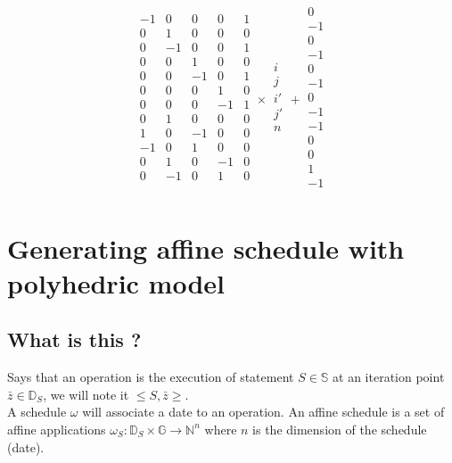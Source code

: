 \begin{itemize}
$$\begin{array}{ccccc}
		-1 & 0  & 0  & 0  & 1  \\
		0  & 1  & 0  & 0  & 0  \\
		0  & -1 & 0  & 0  & 1  \\
		0  & 0  & 1  & 0  & 0  \\
		0  & 0  & -1 & 0  & 1  \\
		0  & 0  & 0  & 1  & 0  \\
		0  & 0  & 0  & -1 & 1  \\
		0  & 1  & 0  & 0  & 0  \\
		1  & 0  & -1 & 0  & 0  \\
		-1 & 0  & 1  & 0  & 0  \\
		0  & 1  & 0  & -1 & 0  \\
		0  & -1 & 0  & 1  & 0  \\
	\end{array}
	\times
	\begin{array}{c}
		i  \\
		j  \\
		i' \\
		j' \\
		n  \\
	\end{array}
	+
	\begin{array}{c}
		0  \\
		-1 \\
		0  \\
		-1 \\
		0  \\
		-1 \\
		0  \\
		-1 \\
		-1 \\
		0  \\
		0  \\
		1  \\
		-1 \\
	\end{array}$$
\end{itemize}


	\section{Generating affine schedule with polyhedric model}

		\subsection{What is this ?}

	Says  that an operation is the execution of statement $S \in \mathbb{S}$ at an iteration point 
$\bar{z} \in \mathbb{D}_{S}$, we will note it $\leq S, \bar{z} \geq$.\\
	A schedule $\omega$ will associate a date to an operation. An affine schedule is a set of affine applications
$\omega_{S}: \mathbb{D}_{S} \times \mathbb{G} \rightarrow \mathbb{N}^{n}$ where $n$ is the dimension of the schedule (date).

